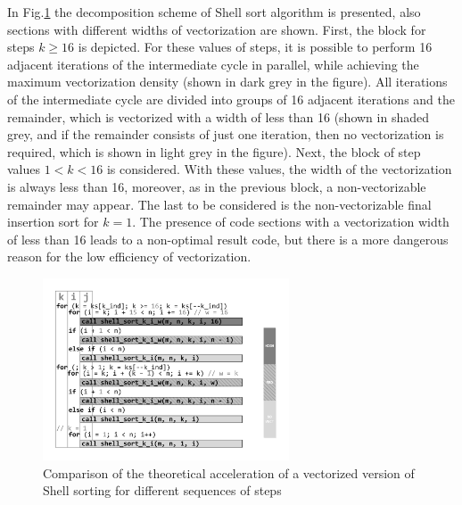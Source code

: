 \documentclass[
11pt,%
tightenlines,%
twoside,%
onecolumn,%
nofloats,%
nobibnotes,%
nofootinbib,%
superscriptaddress,%
noshowpacs,%
centertags]%
{revtex4}
\begin{document}
In Fig.\ref{pic:decompos} the decomposition scheme of Shell sort algorithm is presented, also sections with different widths of vectorization are shown.
First, the block for steps $ k \geq 16 $ is depicted.
For these values of steps, it is possible to perform 16 adjacent iterations of the intermediate cycle in parallel, while achieving the maximum vectorization density (shown in dark grey in the figure).
All iterations of the intermediate cycle are divided into groups of 16 adjacent iterations and the remainder, which is vectorized with a width of less than 16 (shown in shaded grey, and if the remainder consists of just one iteration, then no vectorization is required, which is shown in light grey in the figure).
Next, the block of step values $ 1 <k <16 $ is considered.
With these values, the width of the vectorization is always less than 16, moreover, as in the previous block, a non-vectorizable remainder may appear.
The last to be considered is the non-vectorizable final insertion sort for $ k = 1 $.
The presence of code sections with a vectorization width of less than 16 leads to a non-optimal result code, but there is a more dangerous reason for the low efficiency of vectorization.

\begin{figure}[h]
\setcaptionmargin{5mm}
\onelinecaptionstrue  %
\includegraphics[width=0.65\textwidth]{pics/pic_decomposition.pdf}
\caption{Comparison of the theoretical acceleration of a vectorized version of Shell sorting for different sequences of steps}\label{pic:decompos}
\end{figure}
\end{document}
